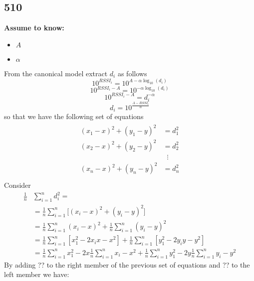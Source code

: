 \documentclass[12pt]{report}
\begin{document}
\subsection{510}
  \begin{center}
  \textbf{Assume to know:}
  \begin{itemize}
    \centering
    \item $A$
    \item $\alpha$
  \end{itemize}
  \end{center}
From the canonical model extract $d_i$ as follows
\begin{equation*}
    10^{RSSI_{i}}=10^{A-\alpha\log_{10}(d_i)}
\end{equation*}
\begin{equation*}
    10^{RSSI_{i}-A}=10^{-\alpha\log_{10}(d_i)}
\end{equation*}
\begin{equation*}
     10^{RSSI_{i}-A}=d_i^{-\alpha}
\end{equation*}
\begin{equation}
    d_i=10^{\frac{A-RSSI_{i}}{\alpha}}
\end{equation}
so that we have the following set of equations
\begin{align}
\begin{split} 
(x_1-x)^2+(y_1-y)^2&=d_1^2 \\ 
(x_2-x)^2+(y_2-y)^2&=d_2^2 \\ 
&\;\;\vdots\\
(x_n-x)^2+(y_n-y)^2&=d_n^2 \\
\end{split}
\end{align}
Consider 
\begin{align}
\frac{1}{n}&\sum_{i=1}^nd_i^2=\\
&=\frac{1}{n}\sum_{i=1}^n\big[(x_i-x)^2+(y_i-y)^2\big]\\
&=\frac{1}{n}\sum_{i=1}^n(x_i-x)^2+\frac{1}{n}\sum_{i=1}^n(y_i-y)^2\\
&=\frac{1}{n}\sum_{i=1}^n[x_1^2-2x_ix-x^2] + \frac{1}{n}\sum_{i=1}^n[y_1^2-2y_iy-y^2]\\
&=\frac{1}{n}\sum_{i=1}^nx_1^2-2x\frac{1}{n}\sum_{i=1}^nx_i- x^2 + \frac{1}{n}\sum_{i=1}^ny_1^2-2y\frac{1}{n}\sum_{i=1}^ny_i- y^2
\end{align}
By adding ?? to the right member of the previous set of equations and ?? to the left member we have:
\end{document}
